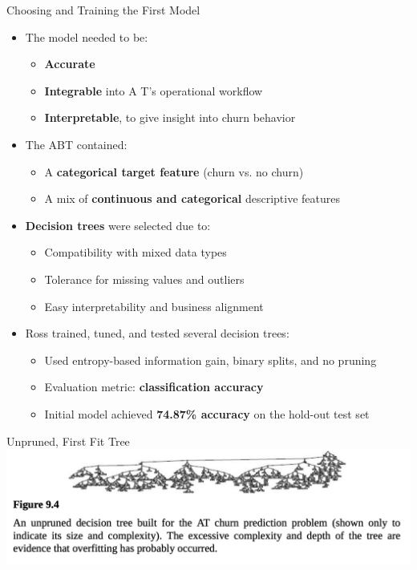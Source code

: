 \documentclass[aspectratio=169,xcolor=dvipsnames]{beamer}
\begin{document}
\begin{frame}{Choosing and Training the First Model}

\begin{itemize}
  \item The model needed to be:
  \begin{itemize}
    \item \textbf{Accurate}
    \item \textbf{Integrable} into A T's operational workflow
    \item \textbf{Interpretable}, to give insight into churn behavior
  \end{itemize}

  \item The ABT contained:
  \begin{itemize}
    \item A \textbf{categorical target feature} (churn vs. no churn)
    \item A mix of \textbf{continuous and categorical} descriptive features
  \end{itemize}

  \item \textbf{Decision trees} were selected due to:
  \begin{itemize}
    \item Compatibility with mixed data types
    \item Tolerance for missing values and outliers
    \item Easy interpretability and business alignment
  \end{itemize}

  \item Ross trained, tuned, and tested several decision trees:
  \begin{itemize}
    \item Used entropy-based information gain, binary splits, and no pruning
    \item Evaluation metric: \textbf{classification accuracy}
    \item Initial model achieved \textbf{74.87\% accuracy} on the hold-out test set
  \end{itemize}
\end{itemize}

\end{frame}

\begin{frame}{Unpruned, First Fit Tree}
\centering
\includegraphics[scale=0.4]{images/unpruned.png}
\end{frame}
\end{document}
